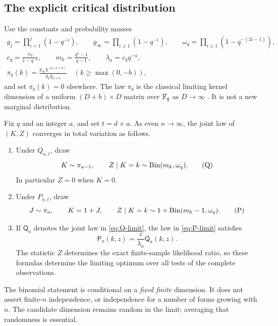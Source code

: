 \subsection{The explicit critical distribution}

Use the constants and probability masses
\begin{gather}
 g_j=\prod_{i=1}^j(1-q^{-i}),\qquad
 g_\infty=\prod_{i\ge1}(1-q^{-i}),\qquad
 \omega_q=\prod_{i\ge1}(1-q^{-(2i-1)}),\label{eq:products}\\
 c_q=\frac{\omega_q}{1-q^{-1}},\qquad
 m_k=\frac{q^k-1}{q-1},\qquad
 \lambda_a=c_q q^{-a},\label{eq:constants}\\
 \pi_b(k)=\frac{g_\infty q^{-k(k+b)}}{g_k g_{k+b}}\quad
 (k\ge\max(0,-b)),\label{eq:pi}
\end{gather}
and set $\pi_b(k)=0$ elsewhere. The law $\pi_b$ is the classical limiting
kernel dimension of a uniform $(D+b)\times D$ matrix over $\mathbb F_q$ as
$D\to\infty$ \cite{fulman}. It is not a new marginal distribution.

\begin{theorem}
\label{thm:main}
Fix $q$ and an integer $a$, and set $t=d+a$. As even $n\to\infty$, the joint
law of $(K,Z)$ converges in total variation as follows.
\begin{enumerate}
\item Under $Q_{n,t}$, draw
\[
 K\sim\pi_{a-1},\qquad Z\mid K=k\sim\operatorname{Bin}(m_k,\omega_q).
 \tag{Q}\label{eq:Q-limit}
\]
In particular $Z=0$ when $K=0$.
\item Under $P_{n,t}$, draw
\[
 J\sim\pi_a,\qquad K=1+J,\qquad
 Z\mid K=k\sim1+\operatorname{Bin}(m_k-1,\omega_q).
 \tag{P}\label{eq:P-limit}
\]
\item If $\mathsf Q_a$ denotes the joint law in \eqref{eq:Q-limit}, the law
in \eqref{eq:P-limit} satisfies
\begin{equation}
 \mathsf P_a(k,z)=\frac{z}{\lambda_a}\mathsf Q_a(k,z).
 \label{eq:sizebias}
\end{equation}
The statistic $Z$ determines the exact finite-sample likelihood ratio, so
these formulas determine the limiting optimum over all tests of the complete
observations.
\end{enumerate}
\end{theorem}

The binomial statement is conditional on a \emph{fixed finite} dimension.
It does not assert finite-$n$ independence, or independence for a number of
forms growing with $n$. The candidate dimension remains random in the limit;
averaging that randomness is essential.

